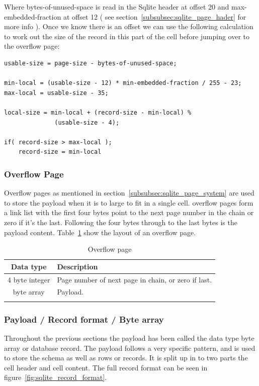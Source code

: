 Where bytes-of-unused-space is read in the Sqlite header at offset 20 and \newline max-embedded-fraction at offset 12 ( see section~\ref{subsubsec:sqlite_page_hader} for more info ). Once we know there is an offset we can use the following calculation to work out the size of the record in this part of the cell before jumping over to the overflow page:  

\begin{lstlisting}	
usable-size = page-size - bytes-of-unused-space;

min-local = (usable-size - 12) * min-embedded-fraction / 255 - 23;
max-local = usable-size - 35;

local-size = min-local + (record-size - min-local) %
			  (usable-size - 4);

if( record-size > max-local );
	record-size = min-local
\end{lstlisting}


\subsubsection{Overflow Page}
\label{subsubsec:overflow_page}

Overflow pages as mentioned in section~\ref{subsubsec:sqlite_page_system} are used to store the payload when it is to large to fit in a single cell. overflow pages form a link list with the first four bytes point to the next page number in the chain or zero if it's the last. Following the four bytes through to the last bytes is the payload content. Table~\ref{tbl:overflow_page} show the layout of an overflow page.

\begin{longtable}[h]{| c | p{5cm} |}
		\hline
			\textbf{Data type} & \textbf{Description} \\ 
		\hline
		\endhead
			4 byte integer & Page number of next page in chain, or zero if last. \\
		\hline
			byte array & Payload. \\
		\hline
	\caption{Overflow page}
	\label{tbl:overflow_page}
\end{longtable}

\subsubsection{Payload / Record format / Byte array}
\label{subsubsec:record_format}

Throughout the previous sections the payload has been called the data type byte array or database record. The payload follows a very specific pattern, and is used to store the schema as well as rows or records. It is split up in to two parts the cell header and cell content. The full record format can be seen in figure~\ref{fig:sqlite_record_format}.

